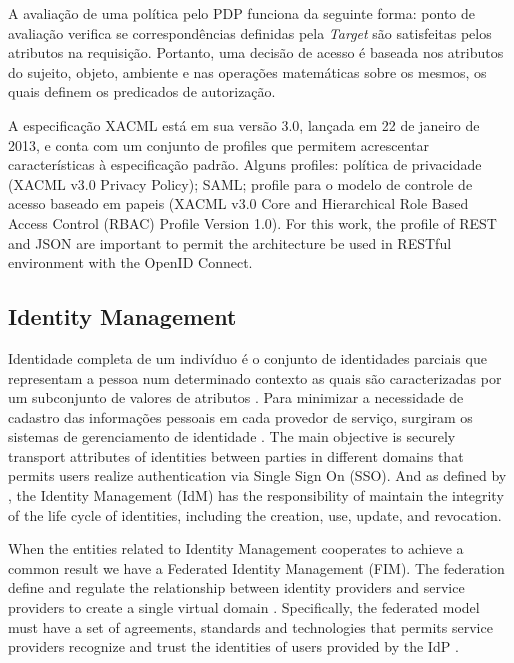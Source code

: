 \documentclass{doublecol-new}
\begin{document}
A avaliação de uma política pelo PDP funciona da seguinte forma: ponto de avaliação verifica se correspondências definidas pela \textit{Target} são satisfeitas pelos atributos na requisição. Portanto, uma decisão de acesso é baseada nos atributos do sujeito, objeto, ambiente e nas operações matemáticas sobre os mesmos, os quais definem os predicados de autorização.
	
A especificação XACML está em sua versão 3.0, lançada em 22 de janeiro de 2013, e conta com um conjunto de profiles que permitem acrescentar características à especificação padrão. Alguns profiles: política de privacidade (XACML v3.0 Privacy Policy); SAML; profile para o modelo de controle de acesso baseado em papeis (XACML v3.0 Core and Hierarchical Role Based Access Control (RBAC) Profile Version 1.0). For this work, the profile of REST and JSON are important to permit the architecture be used in RESTful environment with the OpenID Connect.

\subsection[sec:identitymanag]{Identity Management}
Identidade completa de um indivíduo é o conjunto de identidades parciais que representam a pessoa num determinado contexto as quais são caracterizadas por um subconjunto de valores de atributos \cite{pfitzmann2010terminology}. Para minimizar a necessidade de cadastro das informações pessoais em cada provedor de serviço, surgiram os sistemas de gerenciamento de identidade \cite{el2007survey} \cite{cao2010survey}. The main objective is securely transport attributes of identities between parties in different domains that permits users realize authentication via Single Sign On (SSO). And as defined by \cite{bertino2011identity}, the Identity Management (IdM) has the responsibility of maintain the integrity of the life cycle of identities, including the creation, use, update, and revocation.

When the entities related to Identity Management cooperates to achieve a common result we have a Federated Identity Management (FIM). The federation define and regulate the relationship between identity providers and service providers to create a single virtual domain \citep{perez2014identity} \citep{cao2010survey}. Specifically, the federated model must have a set of agreements, standards and technologies that permits service providers recognize and trust the identities of users provided by the IdP \citep{torres2013survey}.
	
\end{document}
